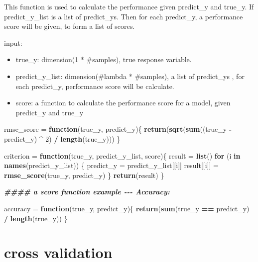 \documentclass[
]{article}
\newenvironment{Shaded}{\begin{snugshade}}{\end{snugshade}}
\newcommand{\ControlFlowTok}[1]{\textcolor[rgb]{0.13,0.29,0.53}{\textbf{#1}}}
\newcommand{\DecValTok}[1]{\textcolor[rgb]{0.00,0.00,0.81}{#1}}
\newcommand{\DocumentationTok}[1]{\textcolor[rgb]{0.56,0.35,0.01}{\textbf{\textit{#1}}}}
\newcommand{\FunctionTok}[1]{\textcolor[rgb]{0.13,0.29,0.53}{\textbf{#1}}}
\newcommand{\NormalTok}[1]{#1}
\newcommand{\OtherTok}[1]{\textcolor[rgb]{0.56,0.35,0.01}{#1}}
\newcommand{\SpecialCharTok}[1]{\textcolor[rgb]{0.81,0.36,0.00}{\textbf{#1}}}
\begin{document}
This function is used to calculate the performance given predict\_y and
true\_y. If predict\_y\_list is a list of predict\_ys. Then for each
predict\_y, a performance score will be given, to form a list of scores.

input:

\begin{itemize}
\item
  true\_y: dimension(1 * \#samples), true response variable.
\item
  predict\_y\_list: dimension(\#lambda * \#samples), a list of
  predict\_ys , for each predict\_y, performance score will be
  calculate.
\item
  score: a function to calculate the performance score for a model,
  given predict\_y and true\_y
\end{itemize}

\begin{Shaded}
\begin{Highlighting}[]
\NormalTok{rmse\_score }\OtherTok{=} \ControlFlowTok{function}\NormalTok{(true\_y, predict\_y)\{}
  \FunctionTok{return}\NormalTok{(}\FunctionTok{sqrt}\NormalTok{(}\FunctionTok{sum}\NormalTok{((true\_y }\SpecialCharTok{{-}}\NormalTok{ predict\_y) }\SpecialCharTok{\^{}} \DecValTok{2}\NormalTok{) }\SpecialCharTok{/} \FunctionTok{length}\NormalTok{(true\_y)))}
\NormalTok{\}}

\NormalTok{criterion }\OtherTok{=} \ControlFlowTok{function}\NormalTok{(true\_y, predict\_y\_list, score)\{}
\NormalTok{  result }\OtherTok{=} \FunctionTok{list}\NormalTok{()}
  \ControlFlowTok{for}\NormalTok{ (i }\ControlFlowTok{in} \FunctionTok{names}\NormalTok{(predict\_y\_list)) \{}
\NormalTok{    predict\_y }\OtherTok{=}\NormalTok{ predict\_y\_list[[i]]}
\NormalTok{    result[[i]] }\OtherTok{=} \FunctionTok{rmse\_score}\NormalTok{(true\_y, predict\_y)}
\NormalTok{  \}}
  \FunctionTok{return}\NormalTok{(result)}
\NormalTok{\} }

\DocumentationTok{\#\#\#\# a score function example {-}{-}{-} Accuracy:}

\NormalTok{accuracy }\OtherTok{=} \ControlFlowTok{function}\NormalTok{(true\_y, predict\_y)\{}
  \FunctionTok{return}\NormalTok{(}\FunctionTok{sum}\NormalTok{(true\_y }\SpecialCharTok{==}\NormalTok{ predict\_y) }\SpecialCharTok{/} \FunctionTok{length}\NormalTok{(true\_y))}
\NormalTok{\}}
\end{Highlighting}
\end{Shaded}

\hypertarget{cross-validation}{%
\section{cross validation}\label{cross-validation}}
\end{document}
